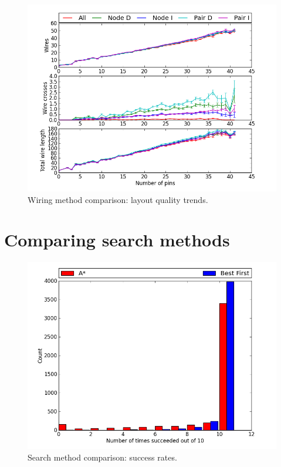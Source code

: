 \begin{figure}
\begin{center}
\includegraphics[width=\textwidth]{Images/wiring_quality_trend_comparison.png}
\caption{Wiring method comparison: layout quality trends.}
\label{fig:wiring_quality_trend}
\end{center}
\end{figure}

\section{Comparing search methods}

\begin{figure}[H]
\begin{center}
\includegraphics[width=\textwidth]{Images/search_success_comparison.png}
\caption{Search method comparison: success rates.}
\label{fig:search_success}
\end{center}
\end{figure}

